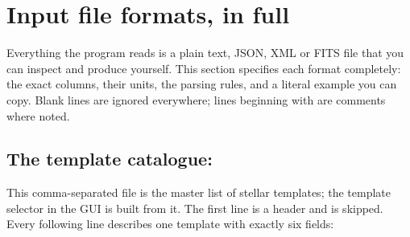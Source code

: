 \section{Input file formats, in full}
\label{sec:input-files}

Everything the program reads is a plain text, JSON, XML or FITS file that
you can inspect and produce yourself. This section specifies each format
completely: the exact columns, their units, the parsing rules, and a
literal example you can copy. Blank lines are ignored everywhere; lines
beginning with \code{\#} are comments where noted.

\subsection{The template catalogue: }
\label{sec:file-catalog}

This comma-separated file is the master list of stellar templates; the
template selector in the GUI is built from it. The first line is a header
and is skipped. Every following line describes one template with exactly
six fields:

